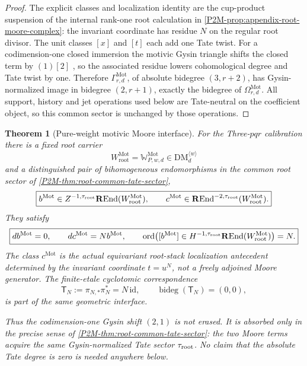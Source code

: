 \documentclass[11pt]{article}
\newtheorem{theorem}{Theorem}[section]
\theoremstyle{remark}
\newcommand{\REnd}{\mathbf R\!\operatorname{End}}
\newcommand{\DM}{\mathrm{DM}}
\newcommand{\bideg}{\operatorname{bideg}}
\newcommand{\Mot}{\mathrm{Mot}}
\newcommand{\rootc}{\mathrm{root}}
\newcommand{\ord}{\operatorname{ord}}
\begin{document}
\begin{proof}
The explicit classes and localization identity are the cup-product suspension
of the internal rank-one root calculation in
\cref{P2M-prop:appendix-root-moore-complex}: the invariant coordinate has
residue \(N\) on the regular root divisor.
The unit classes $[x]$ and $[t]$ each add one Tate twist.  For a codimension-one
closed immersion the motivic Gysin triangle shifts the closed term by
$(1)[2]$ \cite{DegliseGysin2011}, so the associated residue lowers
cohomological degree and Tate twist by one.  Therefore $\Gamma^{\Mot}_{r,d}$, of absolute bidegree $(3,r+2)$,
has Gysin-normalized image in bidegree $(2,r+1)$, exactly the bidegree of
$\Omega^{\Mot}_{r,d}$.  All support, history and jet operations used below are
Tate-neutral on the coefficient object, so this common sector is unchanged by
those operations.
\end{proof}

\begin{theorem}[Pure-weight motivic Moore interface]
\label{P2M-thm:v19-pure-weight-root-seed}
For the Three-$pqr$ calibration there is a fixed root carrier
\[
 W_{\rootc}^{\Mot}=\mathbb W^{\Mot}_{P,w,d}\in\DM_d^{\langle w\rangle}
\]
and a distinguished pair of bihomogeneous endomorphisms in the common root
sector of \cref{P2M-thm:root-common-tate-sector},
\begin{equation}
 \boxed{
 b^{\Mot}\in Z^{-1,\tau_{\rm root}}\REnd(W_{\rootc}^{\Mot}),
 \qquad
 c^{\Mot}\in \REnd^{-2,\tau_{\rm root}}(W_{\rootc}^{\Mot}).}
\end{equation}
They satisfy
\begin{equation}
 \boxed{
 db^{\Mot}=0,\qquad
 dc^{\Mot}=Nb^{\Mot},\qquad
 \ord\!\left([b^{\Mot}]\in
 H^{-1,\tau_{\rm root}}\REnd(W_{\rootc}^{\Mot})\right)=N.}
\end{equation}
The class $c^{\Mot}$ is the actual equivariant root-stack localization
antecedent determined by the invariant coordinate $t=u^N$, not a freely
adjoined Moore generator.  The finite-etale cyclotomic correspondence
\begin{equation}
 \boxed{
 \mathsf T_N:=\pi_{N,*}\pi_N^*=N\,\mathrm{id},
 \qquad \bideg(\mathsf T_N)=(0,0),}
\end{equation}
is part of the same geometric interface.

Thus the codimension-one Gysin shift $(2,1)$ is not erased.  It is absorbed
only in the precise sense of \cref{P2M-thm:root-common-tate-sector}: the two Moore
terms acquire the same Gysin-normalized Tate sector $\tau_{\rm root}$.  No
claim that the absolute Tate degree is zero is needed anywhere below.
\end{theorem}
\end{document}
